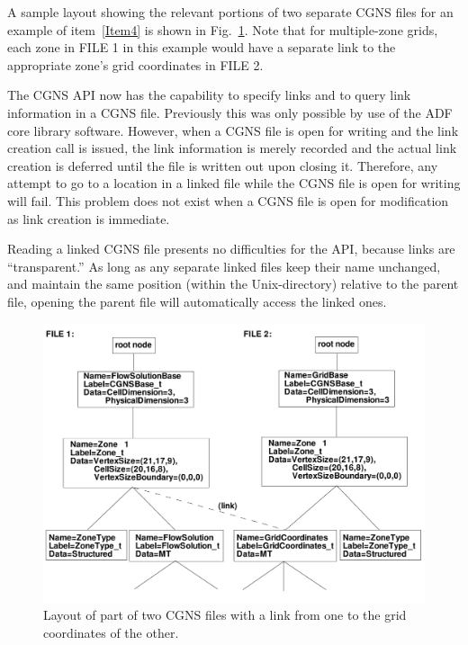 \documentclass[12pt]{article}
\begin{document}
A sample layout showing the relevant portions of two separate CGNS files
for an example of item~\ref{Item4} is shown in Fig.~\ref{FIGtree_link}.
Note that for multiple-zone grids, each zone in FILE 1 in this
example would have a separate link to the appropriate zone's grid
coordinates in FILE 2.

The CGNS API now has the capability to specify links and to query link
information in a CGNS file.
Previously this was only possible by use of the ADF core library
software.
However, when a CGNS file is open for writing and the link creation call
is issued, the link information is merely recorded and the actual link
creation is deferred until the file is written out upon closing it.
Therefore, any attempt to go to a location in a linked file while the
CGNS file is open for writing will fail.
This problem does not exist when a CGNS file is open for modification as
link creation is immediate.

Reading a linked CGNS file presents no difficulties for the API,
because links are ``transparent.''  As long as any separate
linked files keep their name unchanged, and 
maintain the same position (within the Unix-directory)
relative to the parent file, opening the parent
file will automatically access the linked ones.

\begin{figure}[hpbt]
\centerline{{\includegraphics[width=150mm]{figures/tree_link}}}
\caption{Layout of part of two CGNS files with a link
from one to the grid coordinates of the other.}
\label{FIGtree_link}
\end{figure}
%
\end{document}
